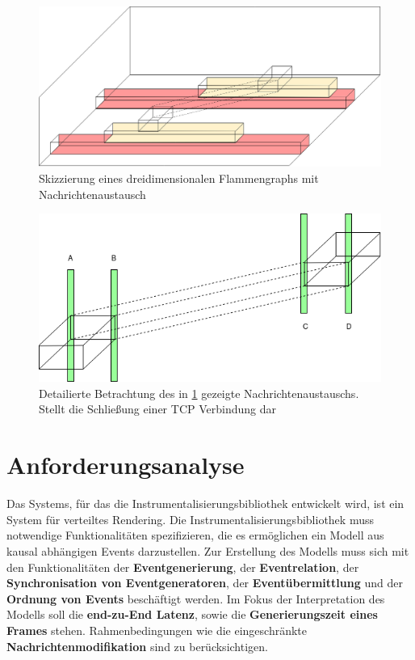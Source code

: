 \begin{figure}[!ht]
	\centering
	\includegraphics[scale=0.3]{img/Problembeschreibung/flamegraph_3D.png}
	\caption[3D Flammengraph]{Skizzierung eines dreidimensionalen Flammengraphs mit Nachrichtenaustausch}
	\label{fig:flamegraph_3D}
\end{figure}

\begin{figure}[!ht]
	\centering
	\includegraphics[scale=0.5]{img/Problembeschreibung/flamegraph_3D_closing.png}
	\caption[Flammengraph TCP schließung]{Detailierte Betrachtung des in \cref{fig:flamegraph_3D} gezeigte Nachrichtenaustauschs. Stellt die Schließung einer TCP Verbindung dar}
	\label{fig:flamegraph_3D_closing}
\end{figure}

\section{Anforderungsanalyse}
\label{section:Anforderungsanalyse}

Das Systems, für das die Instrumentalisierungsbibliothek entwickelt wird, ist ein System für verteiltes Rendering. Die Instrumentalisierungsbibliothek muss notwendige Funktionalitäten spezifizieren, die es ermöglichen ein Modell aus kausal abhängigen Events darzustellen. Zur Erstellung des Modells muss sich mit den Funktionalitäten der \textbf{Eventgenerierung}, der \textbf{Eventrelation}, der \textbf{Synchronisation von Eventgeneratoren}, der \textbf{Eventübermittlung} und der \textbf{Ordnung von Events} beschäftigt werden. Im Fokus der Interpretation des Modells soll die \textbf{end-zu-End Latenz}, sowie die \textbf{Generierungszeit eines Frames} stehen. Rahmenbedingungen wie die eingeschränkte \textbf{Nachrichtenmodifikation} sind zu berücksichtigen.


